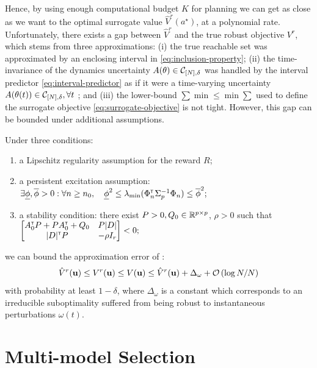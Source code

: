\documentclass{article}
\begin{document}
Hence, by using enough computational budget $K$ for planning we can get as close as we want to the optimal surrogate value $\hat{V}^r(a^{\star})$, at a polynomial rate. Unfortunately, there exists a gap between $\hat{V}^r$ and the true robust objective $V^r$, which stems from three approximations: (i) the true reachable set was approximated by an enclosing interval in \eqref{eq:inclusion-property}; (ii) the time-invariance of the dynamics uncertainty $A(\theta)\in\mathcal{C}_{[N],\delta}$ was handled by the interval predictor \eqref{eq:interval-predictor} as if it were a time-varying uncertainty $A(\theta(t))\in\mathcal{C}_{[N],\delta},\forall t$ ; and (iii) the lower-bound $\sum\min\leq \min\sum$ used to define the surrogate objective \eqref{eq:surrogate-objective} is not tight. However, this gap can be bounded under additional assumptions.
\begin{theorem}
\label{thm:control-error}
Under three conditions:
\begin{enumerate}[nosep]
	\item a Lipschitz regularity assumption for the reward $R$;
	\item a persistent excitation assumption:
	$
	\exists \underline{\phi},\overline{\phi}>0: \forall n\geq n_0,\quad \underline{\phi}^2 \leq \lambda_{\min}(\Phi_{n}^{\mathsf{\scriptscriptstyle T}}\Sigma_{p}^{-1}\Phi_{n}) \leq \overline{\phi}^2;
	$
	\item a stability condition: there exist $P>0,Q_0\in\mathbb{R}^{p\times p}$, $\rho>0$ such that
	$\begin{bmatrix}
		A_0^{\mathsf{\scriptscriptstyle T}} P + P A_0^{\mathsf{\scriptscriptstyle T}} + Q_0 & P|D|  \\
		|D|^{\mathsf{\scriptscriptstyle T}} P & -\rho I_r \\
	\end{bmatrix}< 0;$
\end{enumerate}
 we can bound the approximation error of :
\begin{equation*}
\hat{V}^r(\mathbf{u}) \leq {V}^r(\mathbf{u}) \leq V(\mathbf{u}) \leq \hat{V}^r(\mathbf{u}) + \Delta_\omega + \mathcal{O}\left({\log N / N}\right)
\end{equation*}
with probability at least $1-\delta$, where $\Delta_\omega$ is a constant which corresponds to an irreducible suboptimality suffered from being robust to instantaneous perturbations $\omega(t)$.
\end{theorem}


\section{Multi-model Selection}
\label{sec:multi-model}
\end{document}
